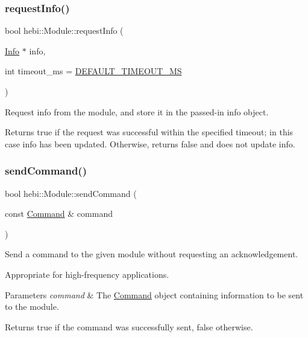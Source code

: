\subsubsection{\texorpdfstring{request\+Info()}{requestInfo()}}
{\footnotesize\ttfamily bool hebi\+::\+Module\+::request\+Info (\begin{DoxyParamCaption}\item[{\hyperlink{classhebi_1_1Info}{Info} $\ast$}]{info,  }\item[{int}]{timeout\+\_\+ms = {\ttfamily \hyperlink{classhebi_1_1Module_afba0d28ff83c8ddabd8f6490e412c821}{D\+E\+F\+A\+U\+L\+T\+\_\+\+T\+I\+M\+E\+O\+U\+T\+\_\+\+MS}} }\end{DoxyParamCaption})}



Request info from the module, and store it in the passed-\/in info object. 

\begin{DoxyReturn}{Returns}
true if the request was successful within the specified timeout; in this case \textquotesingle{}info\textquotesingle{} has been updated. Otherwise, returns false and does not update \textquotesingle{}info\textquotesingle{}. 
\end{DoxyReturn}
\mbox{\label{classhebi_1_1Module_a63034ea7310270b62166380aeb10a5cf}} 
\subsubsection{\texorpdfstring{send\+Command()}{sendCommand()}}
{\footnotesize\ttfamily bool hebi\+::\+Module\+::send\+Command (\begin{DoxyParamCaption}\item[{const \hyperlink{classhebi_1_1Command}{Command} \&}]{command }\end{DoxyParamCaption})}



Send a command to the given module without requesting an acknowledgement. 

Appropriate for high-\/frequency applications.


\begin{DoxyParams}{Parameters}
{\em command} & The \hyperlink{classhebi_1_1Command}{Command} object containing information to be sent to the module.\\
\hline
\end{DoxyParams}
\begin{DoxyReturn}{Returns}
true if the command was successfully sent, false otherwise. 
\end{DoxyReturn}
\mbox{\label{classhebi_1_1Module_a51fb07826384f58697a2e276464d83cb}} 
